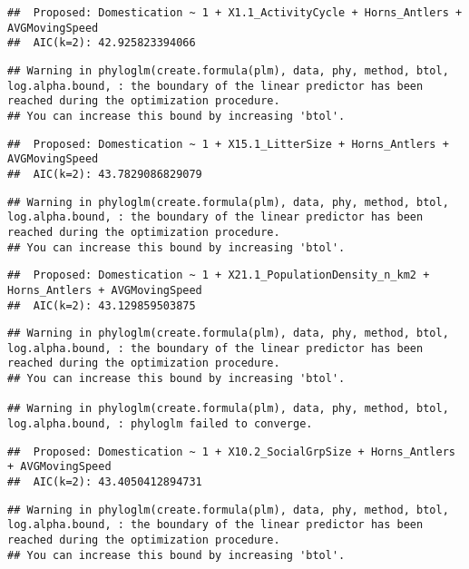 \documentclass[
]{article}
\begin{document}
\begin{verbatim}
##  Proposed: Domestication ~ 1 + X1.1_ActivityCycle + Horns_Antlers + AVGMovingSpeed
##  AIC(k=2): 42.925823394066
\end{verbatim}

\begin{verbatim}
## Warning in phyloglm(create.formula(plm), data, phy, method, btol, log.alpha.bound, : the boundary of the linear predictor has been reached during the optimization procedure.
## You can increase this bound by increasing 'btol'.
\end{verbatim}

\begin{verbatim}
##  Proposed: Domestication ~ 1 + X15.1_LitterSize + Horns_Antlers + AVGMovingSpeed
##  AIC(k=2): 43.7829086829079
\end{verbatim}

\begin{verbatim}
## Warning in phyloglm(create.formula(plm), data, phy, method, btol, log.alpha.bound, : the boundary of the linear predictor has been reached during the optimization procedure.
## You can increase this bound by increasing 'btol'.
\end{verbatim}

\begin{verbatim}
##  Proposed: Domestication ~ 1 + X21.1_PopulationDensity_n_km2 + Horns_Antlers + AVGMovingSpeed
##  AIC(k=2): 43.129859503875
\end{verbatim}

\begin{verbatim}
## Warning in phyloglm(create.formula(plm), data, phy, method, btol, log.alpha.bound, : the boundary of the linear predictor has been reached during the optimization procedure.
## You can increase this bound by increasing 'btol'.

## Warning in phyloglm(create.formula(plm), data, phy, method, btol, log.alpha.bound, : phyloglm failed to converge.
\end{verbatim}

\begin{verbatim}
##  Proposed: Domestication ~ 1 + X10.2_SocialGrpSize + Horns_Antlers + AVGMovingSpeed
##  AIC(k=2): 43.4050412894731
\end{verbatim}

\begin{verbatim}
## Warning in phyloglm(create.formula(plm), data, phy, method, btol, log.alpha.bound, : the boundary of the linear predictor has been reached during the optimization procedure.
## You can increase this bound by increasing 'btol'.
\end{verbatim}
\end{document}
